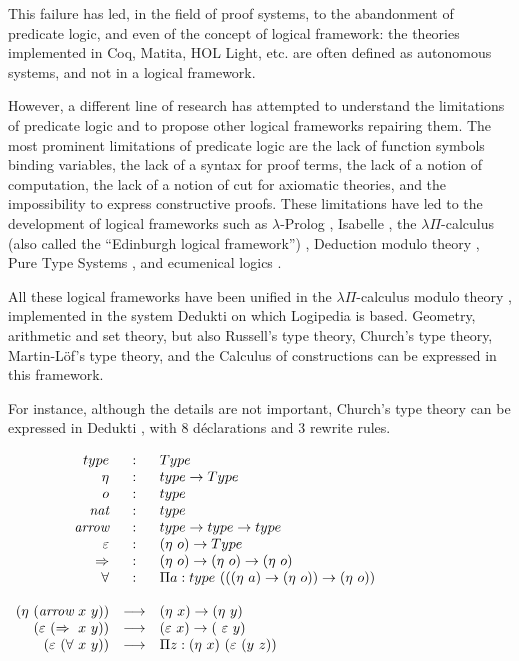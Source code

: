 This failure has led, in the field of proof systems, to the
abandonment of predicate logic, and even of the concept of logical
framework: the theories implemented in Coq, Matita, HOL Light,
etc. are often defined as autonomous systems, and not in a logical
framework.

However, a different line of research has attempted to understand the
limitations of predicate logic and to propose other logical frameworks
repairing them. The most prominent limitations of predicate logic are
the lack of function symbols binding variables, the lack of a syntax
for proof terms, the lack of a notion of computation, the lack of a
notion of cut for axiomatic theories, and the impossibility to express
constructive proofs. These limitations have led to the development of
logical frameworks such as $\lambda$-Prolog \cite{NadathurMiller88,
  MillerNadathur12}, Isabelle \cite{Paulson90}, the $\lambda
\Pi$-calculus (also called the ``Edinburgh logical framework'')
\cite{HarperHonsellPlotkin91}, Deduction modulo theory
\cite{DowekHardinKirchner03, DowekWerner03}, Pure Type Systems
\cite{Berardi88,Terlouw89}, and ecumenical logics
\cite{Prawitz15,Dowek15,PereiraRodriguez17}.

All these logical frameworks have been unified in the $\lambda
\Pi$-calculus modulo theory \cite{CousineauDowek07}, implemented in
the system Dedukti \cite{Assaf16}
on which Logipedia is based. Geometry, arithmetic and set
theory, but also Russell's type theory, Church's type theory,
Martin-L\"of's type theory, and the Calculus of constructions can be
expressed in this framework.

For instance, although the details are not important, Church's type
theory can be expressed in Dedukti , with 8 déclarations and 3
rewrite rules.
\begin{framed}
$\begin{array}{rcl}
type&:&Type\\
\eta&:&type \rightarrow Type\\
o&:&type\\
\mbox{\it nat}&:&type\\
\mbox{\it arrow}&:&type \rightarrow type \rightarrow type\\
\varepsilon&:&(\eta~o) \rightarrow Type\\
\Rightarrow&:&(\eta~o) \rightarrow (\eta~o) \rightarrow (\eta~o)\\
\forall&:&\Pi a:type~(((\eta~a) \rightarrow (\eta~o)) \rightarrow (\eta~o))\\
\\
(\eta~(\mbox{\it arrow}~x~y)) &\longrightarrow& (\eta~x) \rightarrow (\eta~y)\\
(\varepsilon~(\Rightarrow~x~y)) &\longrightarrow& (\varepsilon~x) \rightarrow (\
\varepsilon~y)\\
(\varepsilon~(\forall~x~y)) &\longrightarrow& \Pi z:(\eta~x)~(\varepsilon~(y~z))
\end{array}$
\end{framed}

